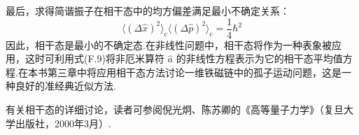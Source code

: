 最后，求得简谐振子在相干态中的均方偏差满足最小不确定关系：
\begin{equation}
  \langle(\Delta\hat{x})^{2}\rangle_{\mathrm{c}}
  \langle(\Delta\hat{p})^{2}\rangle_{\mathrm{c}}
  =\frac{1}{4}\hbar^{2}
\end{equation}
因此，相干态是最小的不确定态.在非线性问题中，相干态将作为一种表象被应用，这时可利用式(F.9)将非厄米算符 $\hat{a}$ 的非线性方程表示为它的相干态平均值方程.在本书第三章中将应用相干态方法讨论一维铁磁链中的孤子运动问题，这是一种良好的准经典近似方法.

有关相干态的详细讨论，读者可参阅倪光炯、陈苏卿的《高等量子力学》（复旦大学出版社，2000年3月）.
